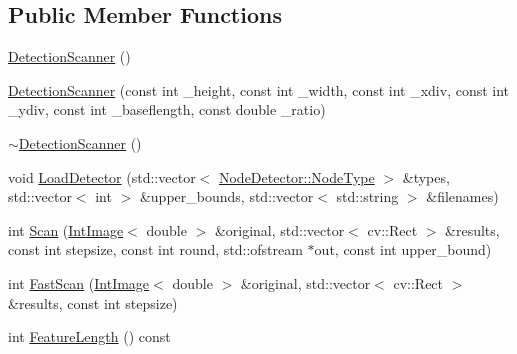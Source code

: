 \subsection*{Public Member Functions}
\begin{DoxyCompactItemize}
\item 
\mbox{\hyperlink{class_detection_scanner_a535d5a56ab512b384b3888bab85ea5eb}{Detection\+Scanner}} ()
\item 
\mbox{\hyperlink{class_detection_scanner_a3c06bb2a16b65a6f592536a93d2c2f9e}{Detection\+Scanner}} (const int \+\_\+height, const int \+\_\+width, const int \+\_\+xdiv, const int \+\_\+ydiv, const int \+\_\+baseflength, const double \+\_\+ratio)
\item 
\mbox{\hyperlink{class_detection_scanner_a45748bbcdf66b62a0122729076a67e17}{$\sim$\+Detection\+Scanner}} ()
\item 
void \mbox{\hyperlink{class_detection_scanner_a36c4db431f28648b82bd6e55afb67008}{Load\+Detector}} (std\+::vector$<$ \mbox{\hyperlink{class_node_detector_a7188c48dfe6b88b3b7f47c599c4832bd}{Node\+Detector\+::\+Node\+Type}} $>$ \&types, std\+::vector$<$ int $>$ \&upper\+\_\+bounds, std\+::vector$<$ std\+::string $>$ \&filenames)
\item 
int \mbox{\hyperlink{class_detection_scanner_afc70267c30bdbef7a128b8e6d05d3d9a}{Scan}} (\mbox{\hyperlink{class_int_image}{Int\+Image}}$<$ double $>$ \&original, std\+::vector$<$ cv\+::\+Rect $>$ \&results, const int stepsize, const int round, std\+::ofstream $\ast$out, const int upper\+\_\+bound)
\item 
int \mbox{\hyperlink{class_detection_scanner_aa27d494b253975922d853070aab7ce4d}{Fast\+Scan}} (\mbox{\hyperlink{class_int_image}{Int\+Image}}$<$ double $>$ \&original, std\+::vector$<$ cv\+::\+Rect $>$ \&results, const int stepsize)
\item 
int \mbox{\hyperlink{class_detection_scanner_a1e36d8da847810fc36860ea87a8eae6f}{Feature\+Length}} () const
\end{DoxyCompactItemize}
